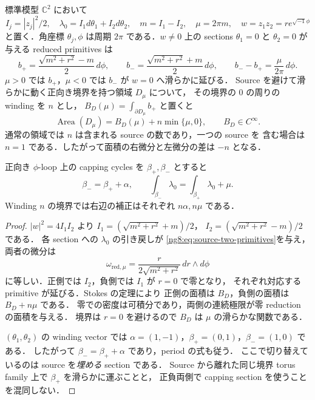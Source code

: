 \begin{lemma}
\label{ng8:source-capping-periods}
標準模型 $\mathbb C^2$ において
\[
 I_j=|z_j|^2/2,\quad
 \lambda_0=I_1d\theta_1+I_2d\theta_2,\quad
 m=I_1-I_2,\quad \mu=2\pi m,
 \quad w=z_1z_2=re^{\sqrt{-1}\phi}
\]
と置く．角座標 $\theta_j,\phi$ は周期 $2\pi$ である．$w\ne0$ 上の
sections $\theta_1=0$ と $\theta_2=0$ が与える reduced primitives は
\begin{equation}\label{ng8:eq:source-two-primitives}
 b_+=\frac{\sqrt{m^2+r^2}-m}{2}\,d\phi,
 \qquad
 b_-=\frac{\sqrt{m^2+r^2}+m}{2}\,d\phi,
 \qquad b_--b_+=\frac{\mu}{2\pi}\,d\phi .
\end{equation}
$\mu>0$ では $b_+$，$\mu<0$ では $b_-$ が $w=0$ へ滑らかに延びる．
Source を避けて滑らかに動く正向き境界を持つ領域 $D_\mu$ について，
その境界の $0$ の周りの winding を $n$ とし，
$B_D(\mu)=\int_{\partial D_\mu}b_+$ と置くと
\begin{equation}\label{ng8:eq:source-area-wall}
 \operatorname{Area}(D_\mu)=B_D(\mu)+n\min\{\mu,0\},
 \qquad B_D\in C^\infty .
\end{equation}
通常の領域では $n$ は含まれる source の数であり，一つの source を
含む場合は $n=1$ である．したがって面積の右微分と左微分の差は $-n$ となる．

正向き $\phi$-loop 上の capping cycles を $\beta_+,\beta_-$ とすると
\begin{equation}\label{ng8:eq:source-capping-shear}
 \beta_-=\beta_++\alpha,
 \qquad
 \int_{\beta_-}\lambda_0=\int_{\beta_+}\lambda_0+\mu .
\end{equation}
Winding $n$ の境界では右辺の補正はそれぞれ $n\alpha,n\mu$ である．
\end{lemma}

\begin{proof}
$|w|^2=4I_1I_2$ より
$I_1=(\sqrt{m^2+r^2}+m)/2$，
$I_2=(\sqrt{m^2+r^2}-m)/2$ である．
各 section への $\lambda_0$ の引き戻しが
\eqref{ng8:eq:source-two-primitives}を与え，両者の微分は
\[
 \omega_{\mathrm{red},\mu}
 =\frac{r}{2\sqrt{m^2+r^2}}\,dr\wedge d\phi
\]
に等しい．正側では $I_2$，負側では $I_1$ が $r=0$ で零となり，
それぞれ対応する primitive が延びる．Stokes の定理により
正側の面積は $B_D$，負側の面積は $B_D+n\mu$ である．
零での密度は可積分であり，両側の連続極限が零 reduction の面積を与える．
境界は $r=0$ を避けるので $B_D$ は $\mu$ の滑らかな関数である．

$(\theta_1,\theta_2)$ の winding vector では
$\alpha=(1,-1)$，$\beta_+=(0,1)$，$\beta_-=(1,0)$ である．
したがって $\beta_-=\beta_++\alpha$ であり，period の式も従う．
ここで切り替えているのは source を\emph{埋める} section である．
Source から離れた同じ境界 torus family 上で $\beta_+$ を滑らかに運ぶことと，
正負両側で capping section を使うことを混同しない．
\end{proof}

